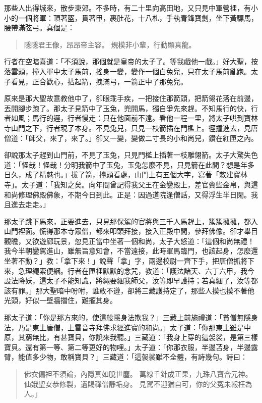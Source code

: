 那些人出得城來，散步東郊。不多時，有二十里向高田地，又只見中軍營裡，有小小的一個將軍：頂著盔，貫著甲，裹肚花，十八札，手執青鋒寶劍，坐下黃驃馬，腰帶滿弦弓。真個是：
\begin{quote}
隱隱君王像，昂昂帝主容。
規模非小輩，行動顯真龍。
\end{quote}

行者在空暗喜道：「不須說，那個就是皇帝的太子了。等我戲他一戲。」好大聖，按落雲頭，撞入軍中太子馬前，搖身一變，變作一個白兔兒，只在太子馬前亂跑。太子看見，正合歡心，拈起箭，拽滿弓，一箭正中了那兔兒。

原來是那大聖故意教他中了，卻眼乖手疾，一把接住那箭頭，把箭翎花落在前邊，丟開腳步跑了。那太子見箭中了玉兔，兜開馬，獨自爭先來趕。不知馬行的快，行者如風；馬行的遲，行者慢走：只在他面前不遠。看他一程一里，將太子哄到寶林寺山門之下，行者現了本身。不見兔兒，只見一枝箭插在門檻上。徑撞進去，見唐僧道：「師父，來了，來了。」卻又一變，變做二寸長的小和尚兒，鑽在紅匣之內。

卻說那太子趕到山門前，不見了玉兔，只見門檻上插著一枝雕翎箭。太子大驚失色道：「怪哉！怪哉！分明我箭中了玉兔，玉兔怎麼不見，只見箭在此間？想是年多日久，成了精魅也。」拔了箭，擡頭看處，山門上有五個大字，寫著「敕建寶林寺」。太子道：「我知之矣。向年間曾記得我父王在金鑾殿上，差官賫些金帛，與這和尚修理佛殿佛象，不期今日到此。正是：因過道院逢僧話，又得浮生半日閑。我且進去走走。」

那太子跳下馬來，正要進去，只見那保駕的官將與三千人馬趕上，簇簇擁擁，都入山門裡面。慌得那本寺眾僧，都來叩頭拜接，接入正殿中間，參拜佛像。卻才舉目觀瞻，又欲遊廊玩景，忽見正當中坐著一個和尚，太子大怒道：「這個和尚無禮！我今半朝鑾駕進山，雖無旨意知會，不當遠接，此時軍馬臨門，也該起身，怎麼還坐著不動？」教：「拿下來！」說聲「拿」字，兩邊校尉一齊下手，把唐僧抓將下來，急理繩索便綑。行者在匣裡默默的念咒，教道：「護法諸天、六丁六甲，我今設法降妖，這太子不能知識，將繩要綑我師父，汝等即早護持；若真綑了，汝等都該有罪。」那大聖暗中吩咐，誰敢不遵，卻將三藏護持定了，那些人摸也摸不著他光頭，好似一壁牆擋住，難攏其身。

那太子道：「你是那方來的，使這般隱身法欺我？」三藏上前施禮道：「貧僧無隱身法，乃是東土唐僧，上雷音寺拜佛求經進寶的和尚。」太子道：「你那東土雖是中原，其窮無比，有甚寶貝，你說來我聽。」三藏道：「我身上穿的這袈裟，是第三樣寶貝。還有第一等、第二等更好的物哩。」太子道：「你那衣服，半邊苫身，半邊露臂，能值多少物，敢稱寶貝？」三藏道：「這袈裟雖不全體，有詩幾句。詩曰：
\begin{quote}
佛衣偏袒不須論，內隱真如脫世塵。
萬線千針成正果，九珠八寶合元神。
仙娥聖女恭修製，遺賜禪僧靜垢身。
見駕不迎猶自可，你的父冤未報枉為人。」
\end{quote}

